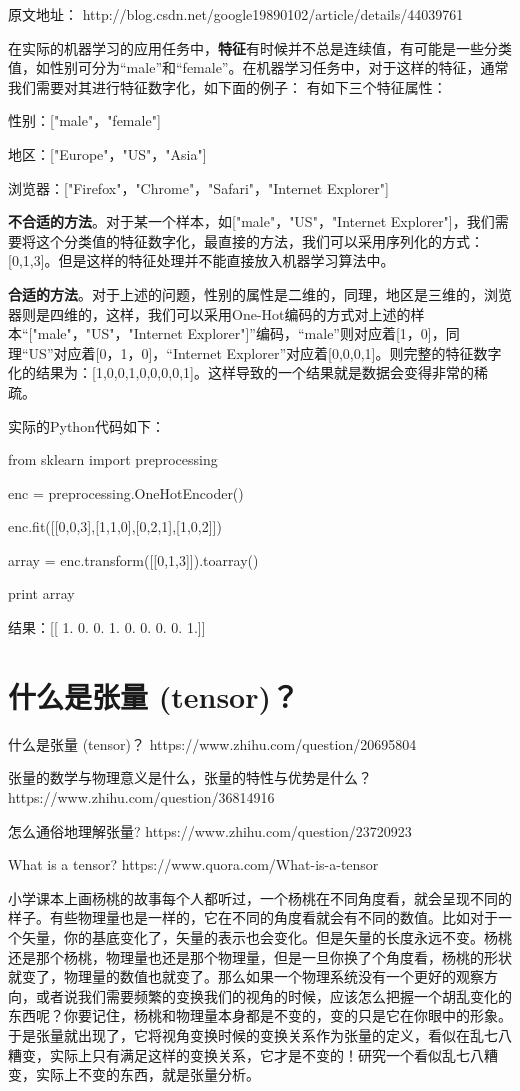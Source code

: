 \documentclass[UTF8]{ctexbook}
\begin{document}
原文地址： http://blog.csdn.net/google19890102/article/details/44039761

在实际的机器学习的应用任务中，\textbf{特征}有时候并不总是连续值，有可能是一些分类值，如性别可分为“male”和“female”。在机器学习任务中，对于这样的特征，通常我们需要对其进行特征数字化，如下面的例子：
有如下三个特征属性：

性别：["male"，"female"]

地区：["Europe"，"US"，"Asia"]

浏览器：["Firefox"，"Chrome"，"Safari"，"Internet Explorer"]

\textbf{不合适的方法}。对于某一个样本，如["male"，"US"，"Internet Explorer"]，我们需要将这个分类值的特征数字化，最直接的方法，我们可以采用序列化的方式：[0,1,3]。但是这样的特征处理并不能直接放入机器学习算法中。

\textbf{合适的方法}。对于上述的问题，性别的属性是二维的，同理，地区是三维的，浏览器则是四维的，这样，我们可以采用One-Hot编码的方式对上述的样本“["male"，"US"，"Internet Explorer"]”编码，“male”则对应着[1，0]，同理“US”对应着[0，1，0]，“Internet Explorer”对应着[0,0,0,1]。则完整的特征数字化的结果为：[1,0,0,1,0,0,0,0,1]。这样导致的一个结果就是数据会变得非常的稀疏。

实际的Python代码如下：

from sklearn import preprocessing

enc = preprocessing.OneHotEncoder()

enc.fit([[0,0,3],[1,1,0],[0,2,1],[1,0,2]])

array = enc.transform([[0,1,3]]).toarray()

print array

结果：[[ 1.  0.  0.  1.  0.  0.  0.  0.  1.]]

\section{什么是张量 (tensor)？}
什么是张量 (tensor)？ https://www.zhihu.com/question/20695804

张量的数学与物理意义是什么，张量的特性与优势是什么？ https://www.zhihu.com/question/36814916

怎么通俗地理解张量? https://www.zhihu.com/question/23720923

What is a tensor? https://www.quora.com/What-is-a-tensor


小学课本上画杨桃的故事每个人都听过，一个杨桃在不同角度看，就会呈现不同的样子。有些物理量也是一样的，它在不同的角度看就会有不同的数值。比如对于一个矢量，你的基底变化了，矢量的表示也会变化。但是矢量的长度永远不变。杨桃还是那个杨桃，物理量也还是那个物理量，但是一旦你换了个角度看，杨桃的形状就变了，物理量的数值也就变了。那么如果一个物理系统没有一个更好的观察方向，或者说我们需要频繁的变换我们的视角的时候，应该怎么把握一个胡乱变化的东西呢？你要记住，杨桃和物理量本身都是不变的，变的只是它在你眼中的形象。于是张量就出现了，它将视角变换时候的变换关系作为张量的定义，看似在乱七八糟变，实际上只有满足这样的变换关系，它才是不变的！研究一个看似乱七八糟变，实际上不变的东西，就是张量分析。
\end{document}

